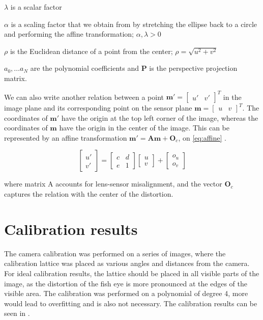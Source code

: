 $\lambda$ is a scalar factor

$\alpha$ is a scaling factor that we obtain from  by stretching the ellipse back to a circle and performing
the affine transformation; $\alpha, \lambda > 0$

$\rho$ is the Euclidean distance of a point from the center; $\rho = \sqrt{u^2 + v^2}$

$a_0, \dots a_N$ are the polynomial coefficients and $\mathbf{P}$ is 
the perspective projection matrix.

We can also write another relation between a point $\textbf{m}' = \begin{bmatrix} u' & v' \end{bmatrix}^{T}$ in the image plane
and its corresponding point on the sensor plane $\textbf{m} = \begin{bmatrix} u & v \end{bmatrix}^{T}$. The coordinates of
$\textbf{m}'$ have the origin at the top left corner of the image, whereas the coordinates of $\textbf{m}$ have the origin in the center of the image.
This can be represented by an affine transformation $\textbf{m}' = \textbf{Am} + \textbf{O}_c$, on \ref{eq:affine} \cite{URBAN201572}.

\begin{equation}
	\begin{bmatrix}
		u' \\
		v'
	\end{bmatrix}
	= 
	\begin{bmatrix}
		c & d \\
		e & 1
	\end{bmatrix}
	\begin{bmatrix}
		u \\
		v
	\end{bmatrix}
	+
	\begin{bmatrix}
		o_u \\
		o_v
	\end{bmatrix}
\label{eq:affine}
\end{equation}

where matrix A accounts for lens-sensor misalignment, and the vector $\textbf{O}_c$ captures the relation with the center of the distortion. 

\section{Calibration results}

The camera calibration was performed on a series of images, where the calibration lattice was placed as various angles and distances from the camera.
For ideal calibration results, the lattice should be placed in all visible parts of the image, as the distortion of the fish eye is more pronounced at the edges
of the visible area. The calibration was performed on a polynomial of degree 4, more would lead to overfitting and is also not necessary.
The calibration results can be seen in .

